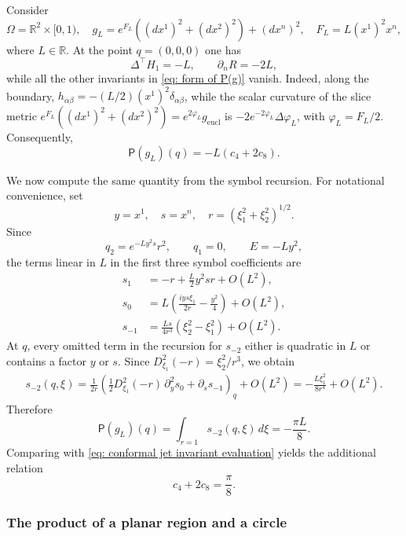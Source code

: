 \documentclass[11pt]{amsart}
\theoremstyle{definition}
\numberwithin{equation}{section}
\begin{document}
Consider 
\[
 \Omega = \mathbb R^2\times [0,1),\quad g_L=e^{F_L}\left((dx^1)^2+(dx^2)^2\right)+(dx^n)^2,
 \quad F_L=L(x^1)^2x^n,
\]
where $L\in\mathbb R$. At the point $q=(0,0,0)$ one has
\begin{equation}\label{eq: curvatures of g_L}
    \Delta^\top H_1=-L,\qquad\partial_n R=-2L, 
\end{equation}
while all the other invariants in \eqref{eq: form of P(g)} vanish.  Indeed, along the boundary, $h_{\alpha\beta}=-(L/2)(x^1)^2\delta_{\alpha\beta}$, while the scalar curvature of the slice metric
$e^{F_L}((dx^1)^2+(dx^2)^2)=e^{2\varphi_L}g_{\mathrm{eucl}}$ is
$-2e^{-2\varphi_L}\Delta\varphi_L$, with $\varphi_L=F_L/2$.
Consequently,
\begin{equation}\label{eq: conformal jet invariant evaluation}
 \mathsf P(g_L)(q)=-L(c_4+2c_8).
\end{equation}

We now compute the same quantity from the symbol recursion.  For notational convenience, set
\[y=x^1,\quad s = x^n, \quad r=(\xi_1^2+\xi_2^2)^{1/2}.\]
Since
\[q_2=e^{-Ly^2s}r^2,\qquad q_1=0,\qquad E=-Ly^2,\]
the terms linear in $L$ in the first three symbol coefficients are
\begin{align*}
 s_1&=-r+\frac L2y^2sr+O(L^2),\\
 s_0&=L\left(\frac{iys\xi_1}{2r}-\frac{y^2}{4}\right)+O(L^2),\\
 s_{-1}&=\frac{Ls}{4r^3}(\xi_2^2-\xi_1^2)+O(L^2).
\end{align*}
At $q$, every omitted term in the recursion for $s_{-2}$ either is quadratic in $L$ or contains a factor $y$ or $s$.  Since
$D_{\xi_1}^2(-r)=\xi_2^2/r^3$, we obtain
\begin{align*}
    s_{-2}(q,\xi)
     =\frac1{2r}\left(
    \frac12D_{\xi_1}^2(-r)\,\partial_y^2s_0
    +\partial_s s_{-1}\right)_{q}+O(L^2) =-\frac{L\xi_1^2}{8r^4}+O(L^2).
   \end{align*}
Therefore
\[
 \mathsf P(g_L)(q)=\int_{r=1}s_{-2}(q,\xi)\,d\xi=-\frac{\pi L}{8}.
\]
Comparing with \eqref{eq: conformal jet invariant evaluation} yields the additional relation
\begin{equation}\label{eq: c_1-c_8 6}
 c_4+2c_8=\frac\pi8.
\end{equation}

\subsubsection{The product of a planar region and a circle}
\end{document}
